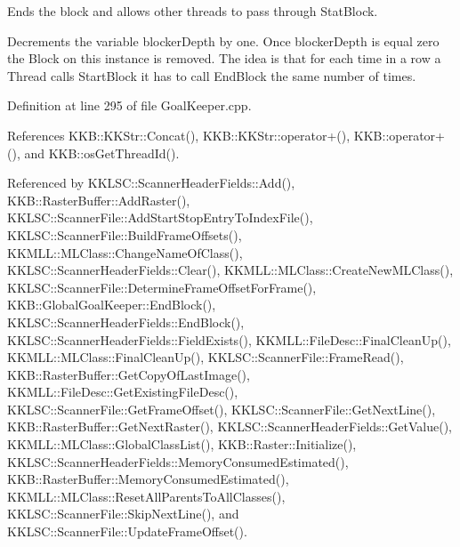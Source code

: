 Ends the block and allows other threads to pass through Stat\+Block. 

Decrements the variable \textquotesingle{}blocker\+Depth\textquotesingle{} by one. Once \textquotesingle{}blocker\+Depth\textquotesingle{} is equal zero the Block on this instance is removed. The idea is that for each time in a row a Thread calls Start\+Block it has to call End\+Block the same number of times. 

Definition at line 295 of file Goal\+Keeper.\+cpp.



References K\+K\+B\+::\+K\+K\+Str\+::\+Concat(), K\+K\+B\+::\+K\+K\+Str\+::operator+(), K\+K\+B\+::operator+(), and K\+K\+B\+::os\+Get\+Thread\+Id().



Referenced by K\+K\+L\+S\+C\+::\+Scanner\+Header\+Fields\+::\+Add(), K\+K\+B\+::\+Raster\+Buffer\+::\+Add\+Raster(), K\+K\+L\+S\+C\+::\+Scanner\+File\+::\+Add\+Start\+Stop\+Entry\+To\+Index\+File(), K\+K\+L\+S\+C\+::\+Scanner\+File\+::\+Build\+Frame\+Offsets(), K\+K\+M\+L\+L\+::\+M\+L\+Class\+::\+Change\+Name\+Of\+Class(), K\+K\+L\+S\+C\+::\+Scanner\+Header\+Fields\+::\+Clear(), K\+K\+M\+L\+L\+::\+M\+L\+Class\+::\+Create\+New\+M\+L\+Class(), K\+K\+L\+S\+C\+::\+Scanner\+File\+::\+Determine\+Frame\+Offset\+For\+Frame(), K\+K\+B\+::\+Global\+Goal\+Keeper\+::\+End\+Block(), K\+K\+L\+S\+C\+::\+Scanner\+Header\+Fields\+::\+End\+Block(), K\+K\+L\+S\+C\+::\+Scanner\+Header\+Fields\+::\+Field\+Exists(), K\+K\+M\+L\+L\+::\+File\+Desc\+::\+Final\+Clean\+Up(), K\+K\+M\+L\+L\+::\+M\+L\+Class\+::\+Final\+Clean\+Up(), K\+K\+L\+S\+C\+::\+Scanner\+File\+::\+Frame\+Read(), K\+K\+B\+::\+Raster\+Buffer\+::\+Get\+Copy\+Of\+Last\+Image(), K\+K\+M\+L\+L\+::\+File\+Desc\+::\+Get\+Existing\+File\+Desc(), K\+K\+L\+S\+C\+::\+Scanner\+File\+::\+Get\+Frame\+Offset(), K\+K\+L\+S\+C\+::\+Scanner\+File\+::\+Get\+Next\+Line(), K\+K\+B\+::\+Raster\+Buffer\+::\+Get\+Next\+Raster(), K\+K\+L\+S\+C\+::\+Scanner\+Header\+Fields\+::\+Get\+Value(), K\+K\+M\+L\+L\+::\+M\+L\+Class\+::\+Global\+Class\+List(), K\+K\+B\+::\+Raster\+::\+Initialize(), K\+K\+L\+S\+C\+::\+Scanner\+Header\+Fields\+::\+Memory\+Consumed\+Estimated(), K\+K\+B\+::\+Raster\+Buffer\+::\+Memory\+Consumed\+Estimated(), K\+K\+M\+L\+L\+::\+M\+L\+Class\+::\+Reset\+All\+Parents\+To\+All\+Classes(), K\+K\+L\+S\+C\+::\+Scanner\+File\+::\+Skip\+Next\+Line(), and K\+K\+L\+S\+C\+::\+Scanner\+File\+::\+Update\+Frame\+Offset().


